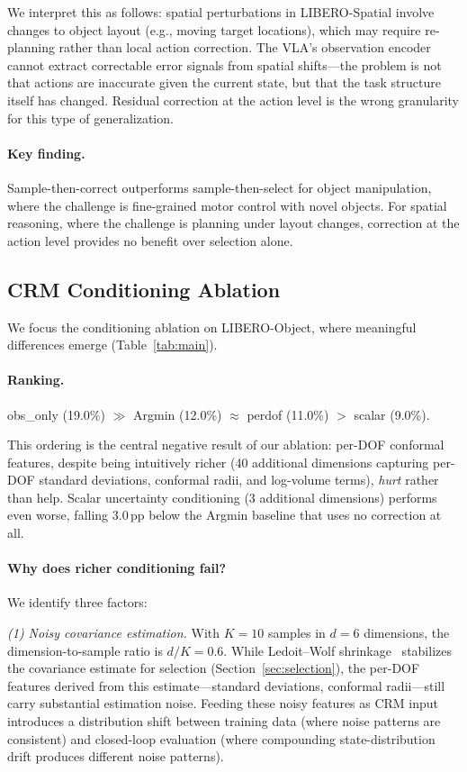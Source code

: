 We interpret this as follows: spatial perturbations in LIBERO-Spatial involve changes to object layout (e.g., moving target locations), which may require re-planning rather than local action correction.
The VLA's observation encoder cannot extract correctable error signals from spatial shifts---the problem is not that actions are inaccurate given the current state, but that the task structure itself has changed.
Residual correction at the action level is the wrong granularity for this type of generalization.

\paragraph{Key finding.}
Sample-then-correct outperforms sample-then-select for object manipulation, where the challenge is fine-grained motor control with novel objects.
For spatial reasoning, where the challenge is planning under layout changes, correction at the action level provides no benefit over selection alone.


\subsection{CRM Conditioning Ablation}
\label{sec:ablation}

We focus the conditioning ablation on LIBERO-Object, where meaningful differences emerge (Table~\ref{tab:main}).

\paragraph{Ranking.}
obs\_only (19.0\%) $\gg$ Argmin (12.0\%) $\approx$ perdof (11.0\%) $>$ scalar (9.0\%).

This ordering is the central negative result of our ablation: per-DOF conformal features, despite being intuitively richer (40 additional dimensions capturing per-DOF standard deviations, conformal radii, and log-volume terms), \emph{hurt} rather than help.
Scalar uncertainty conditioning (3 additional dimensions) performs even worse, falling 3.0\,pp below the Argmin baseline that uses no correction at all.

\paragraph{Why does richer conditioning fail?}
We identify three factors:

\emph{(1) Noisy covariance estimation.}
With $K{=}10$ samples in $d{=}6$ dimensions, the dimension-to-sample ratio is $d/K = 0.6$.
While Ledoit--Wolf shrinkage~\cite{ledoit2004well} stabilizes the covariance estimate for selection (Section~\ref{sec:selection}), the per-DOF features derived from this estimate---standard deviations, conformal radii---still carry substantial estimation noise.
Feeding these noisy features as CRM input introduces a distribution shift between training data (where noise patterns are consistent) and closed-loop evaluation (where compounding state-distribution drift produces different noise patterns).

